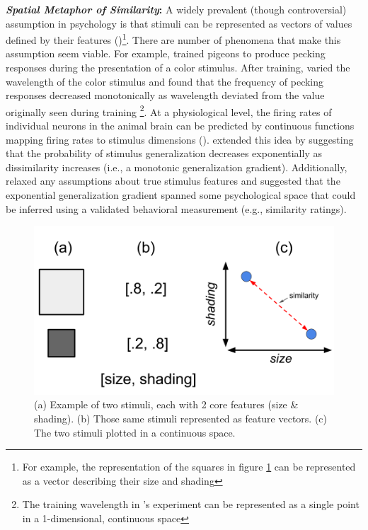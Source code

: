 \documentclass[12pt]{article}
\let\oldcite=\cite
\let\oldtextcite=\textcite
\renewcommand{\cite}[1]{\textcolor[rgb]{0, .121, .388}{\oldcite{#1}}}
\renewcommand{\textcite}[1]{\textcolor[rgb]{0, .121, .388}{\oldtextcite{#1}}}
\begin{document}
\textbf{\emph{Spatial Metaphor of Similarity}:} A widely prevalent (though controversial) assumption in psychology is that stimuli can be represented as vectors of values defined by their features (\cite{shepard1987toward,kurtz2015human})\footnote{For example, the representation of the squares in figure \ref{fig:spatialSimilarity} can be represented as a vector describing their size and shading}. There are number of phenomena that make this assumption seem viable. For example, \textcite{guttman1956discriminability} trained pigeons to produce pecking responses during the presentation of a color stimulus. After training, \textcite{guttman1956discriminability} varied the wavelength of the color stimulus and found that the frequency of pecking responses decreased monotonically as wavelength deviated from the value originally seen during training \footnote{The training wavelength in \textcite{guttman1956discriminability}'s experiment can be represented as a single point in a 1-dimensional, continuous space}. At a physiological level, the firing rates of individual neurons in the animal brain can be predicted by continuous functions mapping firing rates to stimulus dimensions (\cite{butts2006tuning,kang2004information}). \textcite{shepard1987toward} extended this idea by suggesting that the probability of stimulus generalization decreases exponentially as dissimilarity increases (i.e., a monotonic generalization gradient). Additionally, \textcite{shepard1987toward} relaxed any assumptions about true stimulus features and suggested that the exponential generalization gradient spanned some psychological space that could be inferred using a validated behavioral measurement (e.g., similarity ratings). 

\begin{figure}[h]
    \centering
    \label{fig:spatialSimilarity}
    \includegraphics[scale=.4]{figures/spatialSimilarity.png}
    \caption{(a) Example of two stimuli, each with 2 core features (size \& shading). (b) Those same stimuli represented as feature vectors. (c) The two stimuli plotted in a continuous space.}
\end{figure}
\end{document}
